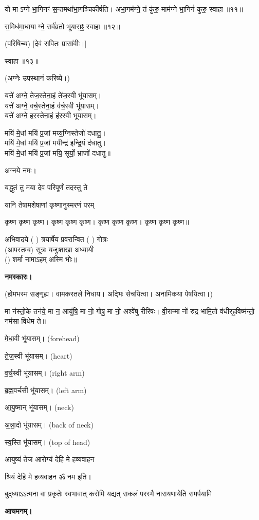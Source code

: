 यो माऽग्ने भा॒गिनꣳ॑ स॒न्तमथा॑भा॒गञ्चिकी॑र्\mbox{}षति। अभा॒गम॑ग्ने॒ तं कु॑रु॒ माम॑ग्ने भा॒गिनं॑ कुरु॒ स्वाहा॥११॥

स॒मिध॑मा॒धायाग्ने॒ सर्व॑व्रतो भूयास॒ꣴ॒ स्वाहा॥१२॥

(परिषिच्य) [देव॑ सवितः॒ प्रासा॑वीः।]

स्वाहा॥१३॥


(अग्नेः उपस्थानं करिष्ये।)

यत्ते॑ अग्ने॒ तेज॒स्तेना॒हं ते॑ज॒स्वी भू॑यासम्।\\
यत्ते॑ अग्ने॒ वर्च॒स्तेना॒हं व॑र्च॒स्वी भू॑यासम्।\\
यत्ते॑ अग्ने॒ हर॒स्तेना॒हं ह॑र॒स्वी भूयासम्।

मयि॑ मे॒धां मयि॑ प्र॒जां मय्य॒ग्निस्तेजो॑ दधातु॒।\\
मयि॑ मे॒धां मयि॑ प्र॒जां मयीन्द्र॑ इन्द्रि॒यं द॑धातु।\\
मयि॑ मे॒धां मयि॑ प्र॒जां मयि॒ सूर्यो॒ भ्राजो॑ दधातु॥
 
अग्नये नमः। 

{यद्धुतं तु मया देव परिपूर्णं तदस्तु ते}

{यानि तेषामशेषाणां कृष्णानुस्मरणं परम्}

कृष्ण कृष्ण कृष्ण। कृष्ण कृष्ण कृष्ण। कृष्ण कृष्ण कृष्ण। कृष्ण कृष्ण कृष्ण॥

अभिवादये ( ) त्रयार्षेय प्रवरान्वित ( ) गोत्रः\\
(आपस्तम्ब) सूत्रः यजुःशाखा अध्यायी\\
() शर्मा नामाऽहम् अस्मि भोः॥

\textbf{नमस्कारः।}



(होमभस्म सङ्गृह्य। वामकरतले निधाय। अद्भिः सेचयित्वा। अनामिकया पेषयित्वा।)

 मा न॑स्तो॒के तन॑ये॒ मा न॒ आयु॑षि॒ मा नो॒ गोषु॒ मा नो॒ अश्वे॑षु रीरिषः। वी॒रान्मा नो॑ रुद्र भामि॒तो व॑धीर्‌ह॒विष्म॑न्तो॒ नम॑सा विधेम ते॥
 
 मे॒धा॒वी भू॑यासम्। (forehead)
 
 ते॒ज॒स्वी भू॑यासम्। (heart)
 
 व॒र्च॒स्वी भू॑यासम्। (right arm)
 
 ब्र॒ह्म॒वर्चसी भू॑यासम्। (left arm)
 
 आ॒यु॒ष्मान् भू॑यासम्। (neck)
 
 अ॒न्ना॒दो भू॑यासम्। (back of neck)
 
 स्व॒स्ति भू॑यासम्। (top of head)
 
 
{आयुष्यं तेज आरोग्यं देहि मे हव्यवाहन}
 
श्रियं देहि मे हव्यवाहन ॐ नम इति।

{बुद्‌ध्याऽऽत्मना वा प्रकृतेः स्वभावात्}
{करोमि यद्यत् सकलं परस्मै}
{नारायणायेति समर्पयामि}

\textbf{आचमनम्।}


 